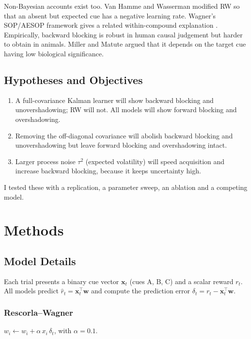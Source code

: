 \documentclass[conference,a4paper]{IEEEtran}
\newcommand{\w}{\mathbf{w}}
\newcommand{\x}{\mathbf{x}}
\begin{document}
Non-Bayesian accounts exist too. Van Hamme and Wasserman \cite{vanhamme1994}
modified RW so that an absent but expected cue has a negative learning rate.
Wagner's SOP/AESOP framework gives a related within-compound explanation
\cite{wagner1989}. Empirically, backward blocking is robust in human causal
judgement \cite{shanks1985} but harder to obtain in animals. Miller and Matute
\cite{miller1996} argued that it depends on the target cue having low biological
significance.

\subsection{Hypotheses and Objectives}
\begin{enumerate}
\item[\textbf{H1}] A full-covariance Kalman learner will show backward blocking
and unovershadowing; RW will not. All models will show forward blocking and
overshadowing.
\item[\textbf{H2}] Removing the off-diagonal covariance will abolish backward
blocking and unovershadowing but leave forward blocking and overshadowing intact.
\item[\textbf{H3}] Larger process noise $\tau^2$ (expected volatility) will
speed acquisition and increase backward blocking, because it keeps uncertainty high.
\end{enumerate}
I tested these with a replication, a parameter sweep, an ablation and a competing model.

\section{Methods}
\subsection{Model Details}
Each trial presents a binary cue vector $\x_t$ (cues A, B, C) and a scalar
reward $r_t$. All models predict $\hat r_t = \x_t^\top \w$ and compute the prediction
error $\delta_t = r_t - \x_t^\top \w$.

\subsubsection{Rescorla--Wagner}
$w_i \leftarrow w_i + \alpha\, x_i\, \delta_t$, with $\alpha = 0.1$.
\end{document}
